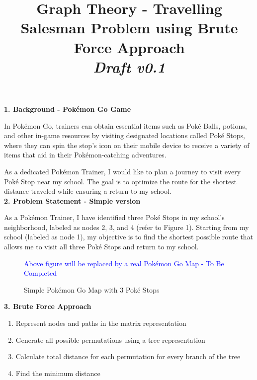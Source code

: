 \documentclass{article}
\title{Graph Theory - Travelling Salesman Problem using Brute Force Approach\\ \textit{Draft v0.1}}
\begin{document}
\maketitle

\textbf{1. Background - Pokémon Go Game}

In Pokémon Go, trainers can obtain essential items such as Poké Balls, potions, and other in-game resources by visiting designated locations called Poké Stops, where they can spin the stop's icon on their mobile device to receive a variety of items that aid in their Pokémon-catching adventures.

As a dedicated Pokémon Trainer, I would like to plan a journey to visit every Poké Stop near my school. The goal is to optimize the route for the shortest distance traveled while ensuring a return to my school.\\

\textbf{2. Problem Statement - Simple version}

As a Pokémon Trainer, I have identified three Poké Stops in my school's neighborhood, labeled as nodes 2, 3, and 4 (refer to Figure 1). Starting from my school (labeled as node 1), my objective is to find the shortest possible route that allows me to visit all three Poké Stops and return to my school.

\begin{figure}[h]
\centering
{}
\caption{Simple Pokémon Go Map with $3$ Poké Stops}
\textcolor{blue}{Above figure will be replaced by a real Pokémon Go Map - To Be Completed} 
\end{figure}

\textbf{3. Brute Force Approach}
\begin{enumerate}
    \item Represent nodes and paths in the matrix representation
    \item Generate all possible permutations using a tree representation
    \item Calculate total distance for each permutation for every branch of the tree
    \item Find the minimum distance  
\end{enumerate}
\end{document}
